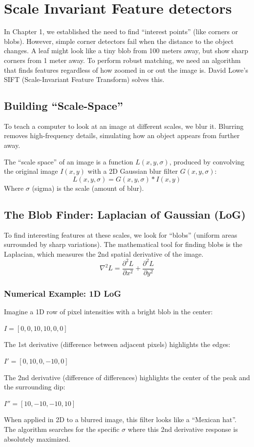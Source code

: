 \documentclass{report}
\begin{document}
\chapter{Scale Invariant Feature detectors}
In Chapter 1, we established the need to find ``interest points'' (like corners or blobs). However, simple corner detectors fail when
the distance to the object changes. A leaf might look like a tiny blob from 100 meters away, but show sharp corners from 1 meter away.
To perform robust matching, we need an algorithm that finds features regardless of how zoomed in or out the image is. David Lowe's SIFT
(Scale-Invariant Feature Transform) solves this.

\section{Building ``Scale-Space''}
To teach a computer to look at an image at different scales, we blur it. Blurring removes high-frequency details, simulating how an object appears from further away.

The ``scale space'' of an image is a function $L(x,y,\sigma)$, produced by convolving the original image $I(x,y)$ with a 2D Gaussian blur filter $G(x,y,\sigma)$:
\begin{equation}
    L(x,y,\sigma) = G(x,y,\sigma) * I(x,y)
\end{equation}
Where $\sigma$ (sigma) is the scale (amount of blur).

\section{The Blob Finder: Laplacian of Gaussian (LoG)}
To find interesting features at these scales, we look for ``blobs'' (uniform areas surrounded by sharp variations). The mathematical tool for finding blobs is the Laplacian, which measures the 2nd spatial derivative of the image.
\begin{equation}
    \nabla^2 L = \frac{\partial^2 L}{\partial x^2} + \frac{\partial^2 L}{\partial y^2}
\end{equation}

\subsection{Numerical Example: 1D LoG}
Imagine a 1D row of pixel intensities with a bright blob in the center:
\begin{center}
    $I = [0, 0, 10, 10, 0, 0]$
\end{center}
The 1st derivative (difference between adjacent pixels) highlights the edges:
\begin{center}
    $I' = [0, 10, 0, -10, 0]$
\end{center}
The 2nd derivative (difference of differences) highlights the center of the peak and the surrounding dip:
\begin{center}
    $I'' = [10, -10, -10, 10]$
\end{center}
When applied in 2D to a blurred image, this filter looks like a ``Mexican hat''. The algorithm searches for the specific $\sigma$ where this 2nd derivative response is absolutely maximized.
\end{document}
